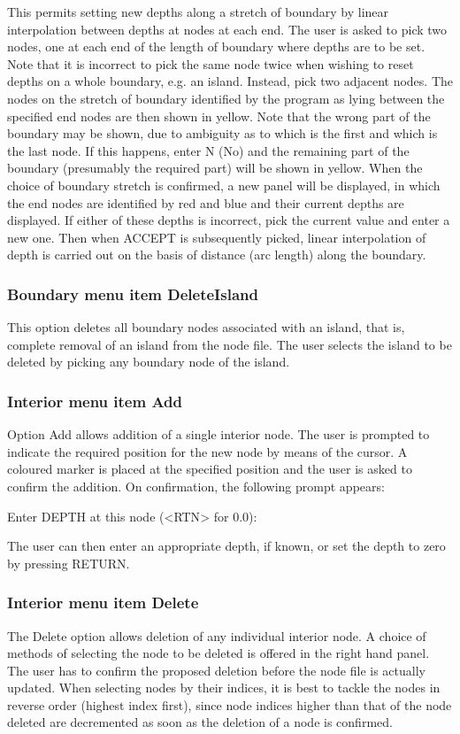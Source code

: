 \documentclass{article}
\begin{document}
This permits setting new depths along a stretch of boundary by linear interpolation between depths at nodes at each end. The user is asked to pick two nodes, one at each end of the length of boundary where depths are to be set. Note that it is incorrect to pick the same node twice when wishing to reset depths on a whole boundary, e.g. an island. Instead, pick two adjacent nodes. The nodes on the stretch of boundary identified by the program as lying between the specified end nodes are then shown in yellow. Note that the wrong part of the boundary may be shown, due to ambiguity as to which is the first and which is the last node. If this happens, enter N (No) and the remaining part of the boundary (presumably the required part) will be shown in yellow. When the choice of boundary stretch is confirmed, a new panel will be displayed, in which the end nodes are identified by red and blue and their current depths are displayed. If either of these depths is incorrect, pick the current value and enter a new one. 
Then when ACCEPT is subsequently picked, linear interpolation of depth is carried out on the basis of distance (arc length) along the boundary.

\subsubsection[Boundary menu item DeleteIsland]{Boundary menu item DeleteIsland}
This option deletes all boundary nodes associated with an island, that is, complete removal of an island from the node file. The user selects the island to be deleted by picking any boundary node of the island.

\subsubsection[Interior menu item Add]{Interior menu item Add}
Option Add allows addition of a single interior node. The user is prompted to indicate the required position for the new node by means of the cursor. A coloured marker is placed at the specified position and the user is asked to confirm the addition. On confirmation, the following prompt appears:

Enter DEPTH at this node ({\textless}RTN{\textgreater} for 0.0):

The user can then enter an appropriate depth, if known, or set the depth to zero by pressing RETURN.

\subsubsection[Interior menu item Delete]{Interior menu item Delete}
The Delete option allows deletion of any individual interior node. A choice of methods of selecting the node to be deleted is offered in the right hand panel. The user has to confirm the proposed deletion before the node file is actually updated. When selecting nodes by their indices, it is best to tackle the nodes in reverse order (highest index first), since node indices higher than that of the node deleted are decremented as soon as the deletion of a node is confirmed.
\end{document}
